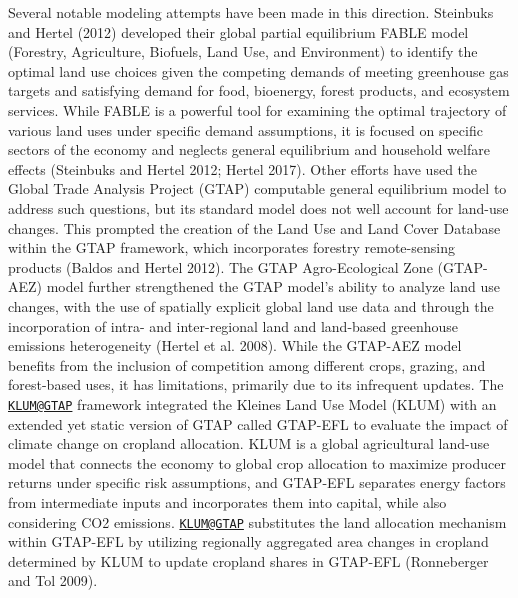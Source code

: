 \documentclass[
]{article}
\begin{document}
Several notable modeling attempts have been made in this direction. Steinbuks and Hertel (2012) developed their global partial equilibrium FABLE model (Forestry, Agriculture, Biofuels, Land Use, and Environment) to identify the optimal land use choices given the competing demands of meeting greenhouse gas targets and satisfying demand for food, bioenergy, forest products, and ecosystem services. While FABLE is a powerful tool for examining the optimal trajectory of various land uses under specific demand assumptions, it is focused on specific sectors of the economy and neglects general equilibrium and household welfare effects (Steinbuks and Hertel 2012; Hertel 2017). Other efforts have used the Global Trade Analysis Project (GTAP) computable general equilibrium model to address such questions, but its standard model does not well account for land-use changes. This prompted the creation of the Land Use and Land Cover Database within the GTAP framework, which incorporates forestry remote-sensing products (Baldos and Hertel 2012). The GTAP Agro-Ecological Zone (GTAP-AEZ) model further strengthened the GTAP model's ability to analyze land use changes, with the use of spatially explicit global land use data and through the incorporation of intra- and inter-regional land and land-based greenhouse emissions heterogeneity (Hertel et al. 2008). While the GTAP-AEZ model benefits from the inclusion of competition among different crops, grazing, and forest-based uses, it has limitations, primarily due to its infrequent updates. The \href{mailto:KLUM@GTAP}{\nolinkurl{KLUM@GTAP}} framework integrated the Kleines Land Use Model (KLUM) with an extended yet static version of GTAP called GTAP-EFL to evaluate the impact of climate change on cropland allocation. KLUM is a global agricultural land-use model that connects the economy to global crop allocation to maximize producer returns under specific risk assumptions, and GTAP-EFL separates energy factors from intermediate inputs and incorporates them into capital, while also considering CO2 emissions. \href{mailto:KLUM@GTAP}{\nolinkurl{KLUM@GTAP}} substitutes the land allocation mechanism within GTAP-EFL by utilizing regionally aggregated area changes in cropland determined by KLUM to update cropland shares in GTAP-EFL (Ronneberger and Tol 2009).
\end{document}
